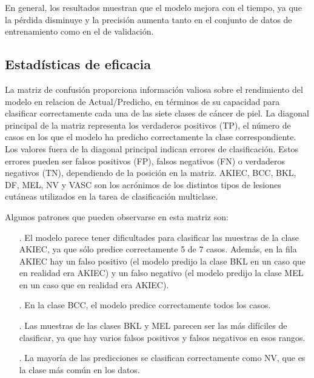     En general, los resultados muestran que el modelo mejora con el tiempo, ya que la pérdida disminuye y la precisión aumenta tanto en el conjunto de datos de entrenamiento como en el de validación.

	\subsection{Estadísticas de eficacia}\label{sub:accuracy_statistic}
    La matriz de confusión proporciona información valiosa sobre el rendimiento del modelo en relacion de Actual/Predicho, en términos de su capacidad para clasificar correctamente cada una de las siete clases de cáncer de piel. 
    La diagonal principal de la matriz representa los verdaderos positivos (TP), el número de casos en los que el modelo ha predicho correctamente la clase correspondiente. Los valores fuera de la diagonal principal indican errores de clasificación. 
    Estos errores pueden ser falsos positivos (FP), falsos negativos (FN) o verdaderos negativos (TN), dependiendo de la posición en la matriz. 
    AKIEC, BCC, BKL, DF, MEL, NV y VASC son los acrónimos de los distintos tipos de lesiones cutáneas utilizados en la tarea de clasificación multiclase.

    Algunos patrones que pueden observarse en esta matriz son:

    \begin{enumerate}
        \item[.] El modelo parece tener dificultades para clasificar las muestras de la clase AKIEC, ya que sólo predice correctamente 5 de 7 casos. 
        Además, en la fila AKIEC hay un falso positivo (el modelo predijo la clase BKL en un caso que en realidad era AKIEC) y un falso negativo (el modelo predijo la clase MEL en un caso que en realidad era AKIEC). 
        \item[.] En la clase BCC, el modelo predice correctamente todos los casos.
        \item[.] Las muestras de las clases BKL y MEL parecen ser las más difíciles de clasificar, ya que hay varios falsos positivos y falsos negativos en esos rangos.
        \item[.] La mayoría de las predicciones se clasifican correctamente como NV, que es la clase más común en los datos.
    \end{enumerate}
    
